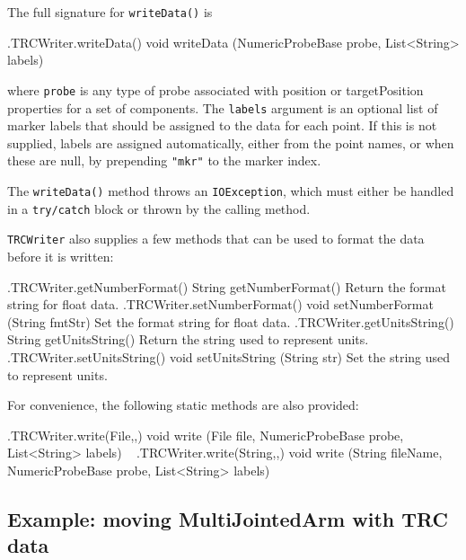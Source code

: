 The full signature for {\tt writeData()} is
%
\begin{methodtable}{0.7}{0.3}
%
\methodentry
{\probes.TRCWriter.writeData()}%
{void writeData (NumericProbeBase probe, List<String> labels)}%
{\ }%
%
\end{methodtable}
%
where {\tt probe} is any type of probe associated with {\sf position} or {\sf
targetPosition} properties for a set of  components.
The {\tt labels} argument is an optional list of marker labels that should be
assigned to the data for each point. If this is not supplied, labels are
assigned automatically, either from the point names, or when these are null, by
prepending {\tt "mkr"} to the marker index.

\begin{sideblock}
The {\tt writeData()} method throws an {\tt IOException}, which must either be
handled in a {\tt try/catch} block or thrown by the calling method.
\end{sideblock}

{\tt TRCWriter} also supplies a few methods that can be used
to format the data before it is written:
%
\begin{methodtable}{0.5}{0.5}
\midline
%
\methodentry
{\probes.TRCWriter.getNumberFormat()}%
{String getNumberFormat()}%
{Return the format string for float data.}%
%
\methodentry
{\probes.TRCWriter.setNumberFormat()}%
{void setNumberFormat (String fmtStr)}%
{Set the format string for float data.}%
%
\methodentry
{\probes.TRCWriter.getUnitsString()}%
{String getUnitsString()}%
{Return the string used to represent units.}%
%
\methodentry
{\probes.TRCWriter.setUnitsString()}%
{void setUnitsString (String str)}%
{Set the string used to represent units.}%
%
\midline
\end{methodtable}
%

For convenience, the following static methods are also provided:
%
\begin{methodtable}{0.7}{0.3}
%
\methodentry
{\probes.TRCWriter.write(File,,)}%
{void write (File file, NumericProbeBase probe, List<String> labels)}%
{\ }%
\methodspace{0.5em}%
%
\methodentry
{\probes.TRCWriter.write(String,,)}%
{void write (String fileName, NumericProbeBase probe, List<String> labels)}%
{\ }%
%
\end{methodtable}

\subsection{Example: moving MultiJointedArm with TRC data}
\label{TRCMultiJointedArm:sec}

